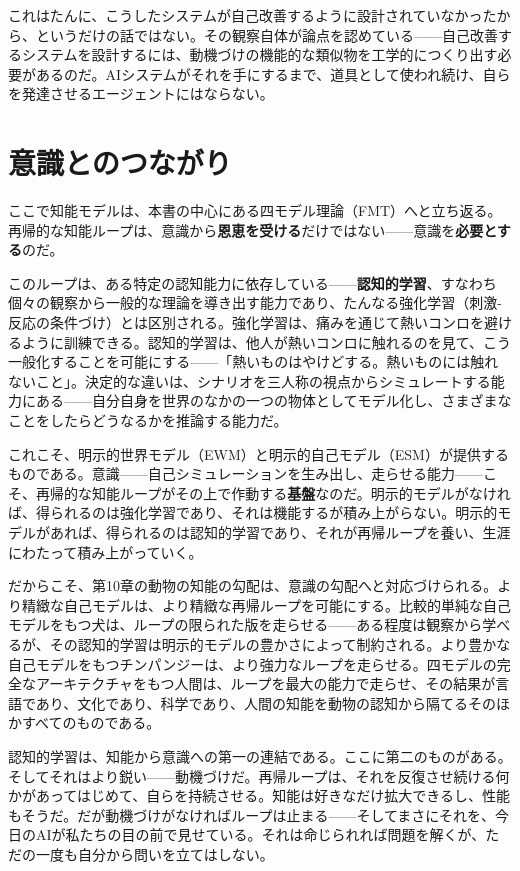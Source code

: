 \documentclass[11pt, twoside, openright]{book}
\begin{document}
これはたんに、こうしたシステムが自己改善するように設計されていなかったから、というだけの話ではない。その観察自体が論点を認めている------自己改善するシステムを設計するには、動機づけの機能的な類似物を工学的につくり出す必要があるのだ。AIシステムがそれを手にするまで、道具として使われ続け、自らを発達させるエージェントにはならない。

\section*{意識とのつながり}

ここで知能モデルは、本書の中心にある四モデル理論（FMT）へと立ち返る。再帰的な知能ループは、意識から\textbf{恩恵を受ける}だけではない------意識を\textbf{必要とする}のだ。

このループは、ある特定の認知能力に依存している------\textbf{認知的学習}、すなわち個々の観察から一般的な理論を導き出す能力であり、たんなる強化学習（刺激-反応の条件づけ）とは区別される。強化学習は、痛みを通じて熱いコンロを避けるように訓練できる。認知的学習は、他人が熱いコンロに触れるのを見て、こう一般化することを可能にする------「熱いものはやけどする。熱いものには触れないこと」。決定的な違いは、シナリオを三人称の視点からシミュレートする能力にある------自分自身を世界のなかの一つの物体としてモデル化し、さまざまなことをしたらどうなるかを推論する能力だ。

これこそ、明示的世界モデル（EWM）と明示的自己モデル（ESM）が提供するものである。意識------自己シミュレーションを生み出し、走らせる能力------こそ、再帰的な知能ループがその上で作動する\textbf{基盤}なのだ。明示的モデルがなければ、得られるのは強化学習であり、それは機能するが積み上がらない。明示的モデルがあれば、得られるのは認知的学習であり、それが再帰ループを養い、生涯にわたって積み上がっていく。

だからこそ、第10章の動物の知能の勾配は、意識の勾配へと対応づけられる。より精緻な自己モデルは、より精緻な再帰ループを可能にする。比較的単純な自己モデルをもつ犬は、ループの限られた版を走らせる------ある程度は観察から学べるが、その認知的学習は明示的モデルの豊かさによって制約される。より豊かな自己モデルをもつチンパンジーは、より強力なループを走らせる。四モデルの完全なアーキテクチャをもつ人間は、ループを最大の能力で走らせ、その結果が言語であり、文化であり、科学であり、人間の知能を動物の認知から隔てるそのほかすべてのものである。

認知的学習は、知能から意識への第一の連結である。ここに第二のものがある。そしてそれはより鋭い------動機づけだ。再帰ループは、それを反復させ続ける何かがあってはじめて、自らを持続させる。知能は好きなだけ拡大できるし、性能もそうだ。だが動機づけがなければループは止まる------そしてまさにそれを、今日のAIが私たちの目の前で見せている。それは命じられれば問題を解くが、ただの一度も自分から問いを立てはしない。
\end{document}

